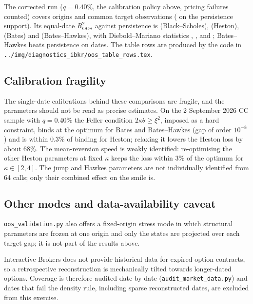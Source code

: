 \OOSHookCheck The corrected run ($q = 0.40\%$, the calibration policy above, pricing
failures counted) covers \OOSForecastOrigins{} origins and
\OOSCommonTargetObservations{} common target observations
(\OOSPersistenceTargetObservations{} on the persistence support).  Its
equal-date $R^2_{\mathrm{OOS}}$ against persistence is \OOSRTwoPersistBS{}
(Black--Scholes), \OOSRTwoPersistH{} (Heston), \OOSRTwoPersistB{} (Bates) and
\OOSRTwoPersistW{} (Bates--Hawkes), with Diebold--Mariano statistics
\OOSDMPersistBS{}, \OOSDMPersistH{}, \OOSDMPersistB{} and \OOSDMPersistW{};
Bates--Hawkes beats persistence on \OOSHawkesDatesBeatPersist{} dates.  The
table rows are produced by the code in
\texttt{../img/diagnostics\_ibkr/oos\_table\_rows.tex}.

\subsection{Calibration fragility}
\label{subsec:oos_fragility}

The single-date calibrations behind these comparisons are fragile, and the
parameters should not be read as precise estimates.  On the 2 September 2026
CC sample with $q=0.40\%$ the Feller condition $2\kappa\theta \ge \xi^2$,
imposed as a hard constraint, binds at the optimum for Bates and
Bates--Hawkes (gap of order $10^{-8}$) and is within 0.3\% of binding for
Heston; relaxing it lowers the Heston loss by about 68\%.  The mean-reversion
speed is weakly identified: re-optimising the other Heston parameters at fixed
$\kappa$ keeps the loss within 3\% of the optimum for $\kappa\in[2,4]$.  The
jump and Hawkes parameters are not individually identified from 64 calls;
only their combined effect on the smile is.

\subsection{Other modes and data-availability caveat}
\label{subsec:ibkr_caveat}

\texttt{oos\_validation.py} also offers a fixed-origin stress mode in which
structural parameters are frozen at one origin and only the states are
projected over each target gap; it is not part of the results above.

Interactive Brokers does not provide historical data for expired option
contracts, so a retrospective reconstruction is mechanically tilted towards
longer-dated options.  Coverage is therefore audited date by date
(\texttt{audit\_market\_data.py}) and dates that fail the density rule,
including sparse reconstructed dates, are excluded from this exercise.
